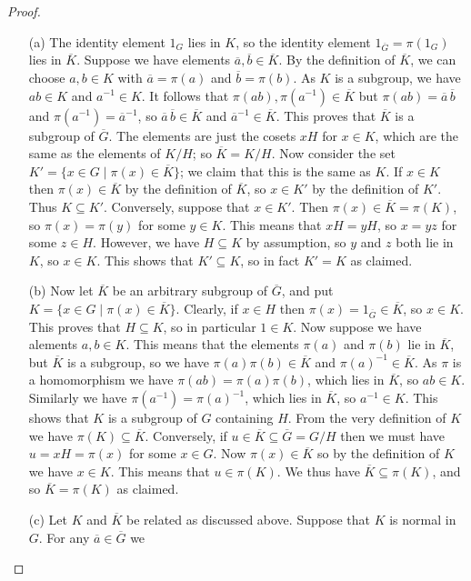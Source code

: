 \documentclass{amsart}
\newcommand{\ov}[1]     {\overline{#1}}
\newcommand{\st}        {\;|\;}
\newcommand{\sse}       {\subseteq}
\renewcommand{\:}{\colon}
\theoremstyle{definition}
\begin{document}
\begin{proof}
 \begin{itemize}
  \item[(a)] The identity element $1_G$ lies in $K$, so the identity
   element $1_{\ov{G}}=\pi(1_G)$ lies in $\ov{K}$.  Suppose we have
   elements $\ov{a},\ov{b}\in\ov{K}$.  By the definition of $\ov{K}$,
   we can choose $a,b\in K$ with $\ov{a}=\pi(a)$ and $\ov{b}=\pi(b)$.
   As $K$ is a subgroup, we have $ab\in K$ and $a^{-1}\in K$.  It
   follows that $\pi(ab),\pi(a^{-1})\in\ov{K}$ but
   $\pi(ab)=\ov{a}\,\ov{b}$ and $\pi(a^{-1})=\ov{a}^{-1}$, so
   $\ov{a}\,\ov{b}\in\ov{K}$ and $\ov{a}^{-1}\in\ov{K}$.  This proves
   that $\ov{K}$ is a subgroup of $\ov{G}$.  The elements are just the
   cosets $xH$ for $x\in K$, which are the same as the elements of
   $K/H$; so $\ov{K}=K/H$.  Now consider the set
   $K'=\{x\in G\st \pi(x)\in\ov{K}\}$; we claim that this is the same
   as $K$.  If $x\in K$ then $\pi(x)\in\ov{K}$ by the definition of
   $\ov{K}$, so $x\in K'$ by the definition of $K'$.  Thus
   $K\sse K'$.  Conversely, suppose that $x\in K'$.  Then
   $\pi(x)\in\ov{K}=\pi(K)$, so $\pi(x)=\pi(y)$ for some $y\in K$.
   This means that $xH=yH$, so $x=yz$ for some $z\in H$.  However, we
   have $H\sse K$ by assumption, so $y$ and $z$ both lie in $K$, so
   $x\in K$.  This shows that $K'\sse K$, so in fact $K'=K$ as
   claimed.
  \item[(b)] Now let $\ov{K}$ be an arbitrary subgroup of $\ov{G}$,
   and put $K=\{x\in G\st\pi(x)\in\ov{K}\}$.  Clearly, if $x\in H$
   then $\pi(x)=1_{\ov{G}}\in\ov{K}$, so $x\in K$.  This proves that
   $H\sse K$, so in particular $1\in K$.  Now suppose we have alements
   $a,b\in K$.  This means that the elements $\pi(a)$ and $\pi(b)$ lie
   in $\ov{K}$, but $\ov{K}$ is a subgroup, so we have
   $\pi(a)\pi(b)\in\ov{K}$ and $\pi(a)^{-1}\in\ov{K}$.  As $\pi$ is a
   homomorphism we have $\pi(ab)=\pi(a)\pi(b)$, which lies in
   $\ov{K}$, so $ab\in K$.  Similarly we have
   $\pi(a^{-1})=\pi(a)^{-1}$, which lies in $\ov{K}$, so
   $a^{-1}\in K$.  This shows that $K$ is a subgroup of $G$ containing
   $H$.  From the very definition of $K$ we have $\pi(K)\sse\ov{K}$.
   Conversely, if $u\in\ov{K}\sse\ov{G}=G/H$ then we must have
   $u=xH=\pi(x)$ for some $x\in G$.  Now $\pi(x)\in\ov{K}$ so by the
   definition of $K$ we have $x\in K$.  This means that $u\in\pi(K)$.
   We thus have $\ov{K}\sse\pi(K)$, and so $\ov{K}=\pi(K)$ as
   claimed.
  \item[(c)] Let $K$ and $\ov{K}$ be related as discussed above.
   Suppose that $K$ is normal in $G$.  For any $\ov{a}\in\ov{G}$ we

\end{itemize}
\end{proof}
\end{document}
